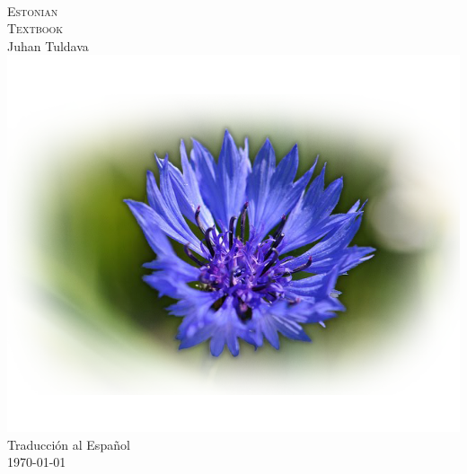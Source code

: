 \begin{titlepage}
\begin{center}

	\textsc{ \fontsize{7cm}{1em}\selectfont \\[1.7cm] Estonian\\[0.3cm] 
	\Huge{Textbook}}\\[0.5cm]
	
	Juhan Tuldava \dag\\
	\includegraphics[scale=0.69]{images/Estonian_Flower.png}
	\vfill 
	Traducción al Español\\
	\today

\end{center}
\end{titlepage}
\thispagestyle{empty}
